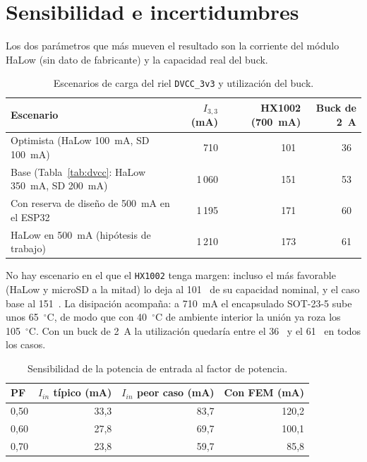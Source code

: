 \documentclass[11pt,a4paper]{article}
\newcommand{\pct}{\text{\char37}}
\begin{document}
\section{Sensibilidad e incertidumbres}
\label{sec:sensibilidad}

Los dos parámetros que más mueven el resultado son la corriente del módulo
HaLow (sin dato de fabricante) y la capacidad real del buck.

\begin{table}[H]
\centering
\caption{Escenarios de carga del riel \texttt{DVCC\_3v3} y utilización del buck.}
\label{tab:escenarios}
\small
\begin{tabularx}{\textwidth}{@{}X r r r@{}}
\toprule
\textbf{Escenario} & \textbf{$I_{3,3}$ (mA)} & \textbf{HX1002 (700~mA)} & \textbf{Buck de 2~A} \\
\midrule
Optimista (HaLow 100~mA, SD 100~mA) & 710 & 101~\pct & 36~\pct \\
Base (Tabla~\ref{tab:dvcc}: HaLow 350~mA, SD 200~mA) & 1\,060 & 151~\pct & 53~\pct \\
Con reserva de diseño de 500~mA en el ESP32 & 1\,195 & 171~\pct & 60~\pct \\
HaLow en 500~mA (hipótesis de trabajo) & 1\,210 & 173~\pct & 61~\pct \\
\bottomrule
\end{tabularx}
\end{table}

\noindent No hay escenario en el que el \texttt{HX1002} tenga margen: incluso el
más favorable (HaLow y microSD a la mitad) lo deja al 101~\pct{} de su capacidad
nominal, y el caso base al 151~\pct{}. La disipación acompaña: a 710~mA el
encapsulado SOT-23-5 sube unos 65~$^\circ$C, de modo que con 40~$^\circ$C de
ambiente interior la unión ya roza los 105~$^\circ$C. Con un buck de 2~A la
utilización quedaría entre el 36~\pct{} y el 61~\pct{} en todos los casos.

\begin{table}[H]
\centering
\caption{Sensibilidad de la potencia de entrada al factor de potencia.}
\label{tab:pf}
\small
\begin{tabularx}{\textwidth}{@{}X r r r@{}}
\toprule
\textbf{PF} & \textbf{$I_{in}$ típico (mA)} & \textbf{$I_{in}$ peor caso (mA)} & \textbf{Con FEM (mA)} \\
\midrule
0,50 & 33,3 & 83,7 & 120,2 \\
0,60 & 27,8 & 69,7 & 100,1 \\
0,70 & 23,8 & 59,7 & 85,8 \\
\bottomrule
\end{tabularx}
\end{table}
\end{document}
